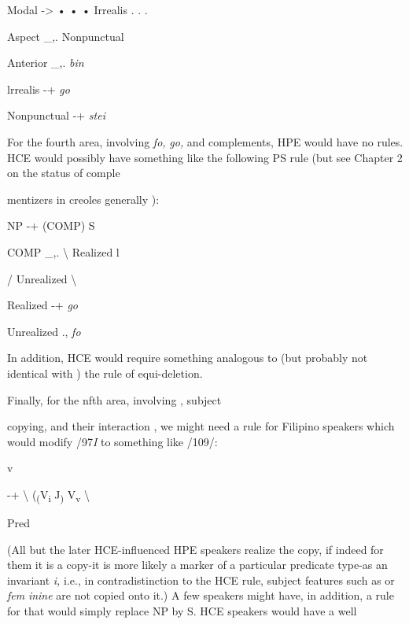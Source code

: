 \ea\label{ex:100}
 Modal {}-{\textgreater} • • • Irrealis . . .
\glt
\z

\ea\label{ex:101}
 Aspect \_,. Nonpunctual
\glt
\z

\ea\label{ex:102}
 Anterior \_,. \textit{bin}
\glt
\z

\ea\label{ex:103}
 lrrealis {}-+ \textit{go}
\glt
\z

\ea\label{ex:104}
 Nonpunctual {}-+ \textit{stei}
\glt
\z


For the fourth area, involving \textit{fo,} \textit{go,} and  comple\-ments, HPE would have no rules. HCE would possibly have something like the following PS rule (but see Chapter 2 on the status of comple\-

mentizers in creoles generally ):

\ea\label{ex:105}
NP {}-+ (COMP) S
\glt
\z

\ea\label{ex:106}
 COMP \_,. {\textbackslash} Realized l
\glt
\z

/ Unrealized {\textbackslash}

\ea\label{ex:107}
 Realized {}-+ \textit{go}
\glt
\z

\ea\label{ex:108}
Unrealized ., \textit{fo}
\glt
\z

In addition, HCE would require something analogous to (but probably not identical with ) the  rule of equi-deletion.

Finally, for the nfth area, involving , subject\-

copying, and their interaction , we might need a rule for Filipino speak\-ers which would modify /97\textit{I} to something like /109/:

\ea\label{ex:109}
 v
\glt
\z

{}-+ {\textbackslash} (\textsubscript{(}V\textsubscript{i}\textsubscript{ }J\textsubscript{) }V\textsubscript{v}\textsubscript{ }{\textbackslash}

Pred

(All but the later HCE-influenced HPE speakers realize the copy, if indeed for them it is a copy-it is more likely a marker of a particular predicate type-as an invariant \textit{i, }i.e., in contradistinction to the HCE rule, subject features such as \textit{ }or \textit{fem} \textit{inine} are not copied onto it.) A few speakers might have, in addition, a rule for  that would simply replace NP by S. HCE speakers would have a well\-

